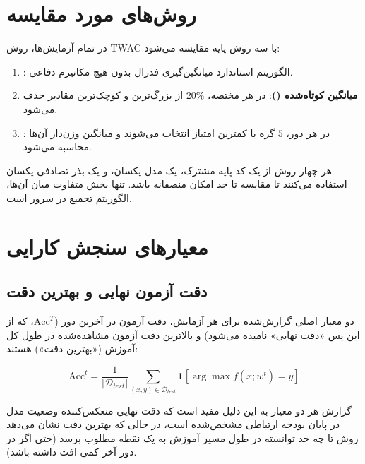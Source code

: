 \section{روش‌های مورد مقایسه}
\label{sec:sim_baselines}

در تمام آزمایش‌ها، روش \gls{TWAC} با سه روش پایه مقایسه می‌شود:

\begin{enumerate}
    \item \textbf{}: الگوریتم استاندارد میانگین‌گیری فدرال بدون هیچ مکانیزم دفاعی.
    
    \item \textbf{میانگین کوتاه‌شده ()}: در هر مختصه، $20\%$ از بزرگ‌ترین و کوچک‌ترین مقادیر حذف می‌شود.
    
    \item \textbf{}: در هر دور، $5$ گره با کمترین امتیاز  انتخاب می‌شوند و میانگین وزن‌دار آن‌ها محاسبه می‌شود.
\end{enumerate}

هر چهار روش از یک کد پایه مشترک، یک مدل یکسان، و یک بذر تصادفی یکسان استفاده می‌کنند تا مقایسه تا حد امکان منصفانه باشد. تنها بخش متفاوت میان آن‌ها، الگوریتم تجمیع در سرور است.


\section{معیارهای سنجش کارایی}
\label{sec:sim_metrics}

\subsection{دقت آزمون نهایی و بهترین دقت}

دو معیار اصلی گزارش‌شده برای هر آزمایش، دقت آزمون در آخرین دور ($\text{Acc}^T$، که از این پس «دقت نهایی» نامیده می‌شود) و بالاترین دقت آزمون مشاهده‌شده در طول کل آموزش («بهترین دقت») هستند:

\begin{equation}
    \text{Acc}^t = \frac{1}{|\mathcal{D}_{test}|} \sum_{(x,y) \in \mathcal{D}_{test}} \mathbf{1}[\arg\max f(x; w^t) = y]
    \label{eq:accuracy}
\end{equation}

گزارش هر دو معیار به این دلیل مفید است که دقت نهایی منعکس‌کننده وضعیت مدل در پایان بودجه ارتباطی مشخص‌شده است، در حالی که بهترین دقت نشان می‌دهد روش تا چه حد توانسته در طول مسیر آموزش به یک نقطه مطلوب برسد (حتی اگر در دور آخر کمی افت داشته باشد).

